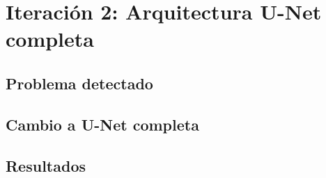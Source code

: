 \chapter{Iteración 2: Arquitectura U-Net completa}\label{full_unet}

\section{Problema detectado}\label{sec:full_unet_problem}

\section{Cambio a U-Net completa}\label{sec:full_unet_change}

\section{Resultados}\label{sec:full_unet_resultados}
